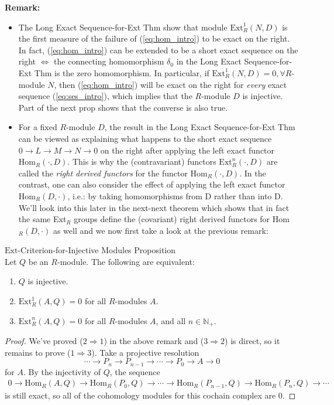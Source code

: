 \noindent\textbf{Remark:} \begin{itemize}
    \item The Long Exact Sequence-for-Ext Thm show that module $\text{Ext}_R^1 (N,D)$ is the first measure of the failure of (\ref{eq:hom_intro}) to be exact on the right. In fact, (\ref{eq:hom_intro}) can be extended to be a short exact sequence on the right $\Leftrightarrow$ the connecting homomorphism $\delta_0$ in the Long Exact Sequence-for-Ext Thm is the zero homomorphism. In particular, if $\text{Ext}_R^1 (N,D)=0, \forall R$-module $N$, then (\ref{eq:hom_intro}) will be exact on the right for \textit{every} exact sequence (\ref{eq:ses_intro}), which implies that the $R$-module $D$ is injective. Part of the next prop shows that the converse is also true.

    \item For a fixed $R$-module $D$, the result in the Long Exact Sequence-for-Ext Thm can be viewed as explaining what happens to the short exact sequence $0\to L \to M \to N\to 0$ on the right after applying the left exact functor $\text{Hom}_R(\cdot, D)$. This is why the (contravariant) functors $\text{Ext}_R^n(\cdot, D)$ are called the \textit{right derived functors} for the functor $\text{Hom}_R(\cdot, D)$. In the contrast, one can also consider the effect of applying the left exact functor Hom$_R(D, \cdot)$, i.e.: by taking homomorphisms from D rather than into D. We'll look into this later in the next-next theorem which shows that in fact the same Ext$_R$ groups define the (covariant) right derived functors for Hom$_R(D,\cdot)$ as well and we now first take a look at the previous remark:
\end{itemize}

\begin{proposition}{$\text{Ext}$-Criterion-for-Injective Modules Proposition}\\
Let $Q$ be an $R$-module. The following are equivalent:
\begin{enumerate}
    \item $Q$ is injective.
    \item $\text{Ext}_R^1 (A,Q)=0$ for all $R$-modules $A$.
    \item $\text{Ext}_R^n (A,Q)=0$ for all $R$-modules $A$, and all $n\in \mathbb{N}_+$.
\end{enumerate}
\end{proposition}

\begin{proof}
    We've proved ($2\Rightarrow1$) in the above remark and ($3\Rightarrow2$) is direct, so it remains to prove ($1\Rightarrow3$). Take a projective resolution
    \[
    \cdots \to P_n \to P_{n-1} \to \cdots \to P_0 \to A\to 0
    \]
    for $A$. By the injectivity of $Q$, the sequence 
    \begin{align*}
        0\to \text{Hom}_R (A,Q) \to \text{Hom}_R (P_0,Q) \to \cdots \to \text{Hom}_R (P_{n-1},Q) \to \text{Hom}_R (P_n,Q) \to \cdots
    \end{align*}
    is still exact, so all of the cohomology modules for this cochain complex are 0.
\end{proof}


